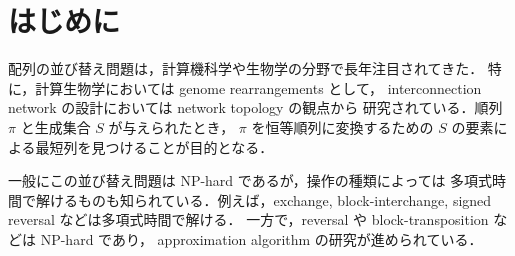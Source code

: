 \documentclass[paper=a4,fontsize=11pt,report,oneside]{jlreq}
\begin{document}











\tableofcontents

\newpage

\newpage
{}

\chapter{はじめに}

配列の並び替え問題は，計算機科学や生物学の分野で長年注目されてきた．
特に，計算生物学においては genome rearrangements として，
interconnection network の設計においては network topology の観点から
研究されている．順列 $\pi$ と生成集合 $S$ が与えられたとき，
$\pi$ を恒等順列に変換するための $S$ の要素による最短列を見つけることが目的となる．

一般にこの並び替え問題は NP-hard であるが，操作の種類によっては
多項式時間で解けるものも知られている．例えば，exchange,
block-interchange, signed reversal などは多項式時間で解ける．
一方で，reversal や block-transposition などは NP-hard であり，
approximation algorithm の研究が進められている．
\end{document}
